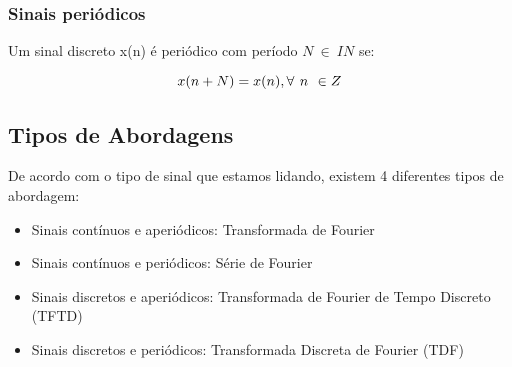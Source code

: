 \subsubsection{Sinais periódicos}
Um sinal discreto x(n) é periódico com período $N \ \in \ IN$ se:

\[ \large x(n + N) = x(n), \forall \ n \ \in Z \]

\subsection {Tipos de Abordagens}

De acordo com o tipo de sinal que estamos lidando, existem 4 diferentes tipos de abordagem:
\begin{itemize}
\item Sinais contínuos e aperiódicos: Transformada de Fourier
\item Sinais contínuos e periódicos: Série de Fourier
\item Sinais discretos e aperiódicos: Transformada de Fourier de Tempo Discreto (TFTD)
\item Sinais discretos e periódicos: Transformada Discreta de Fourier (TDF)
\end{itemize}

